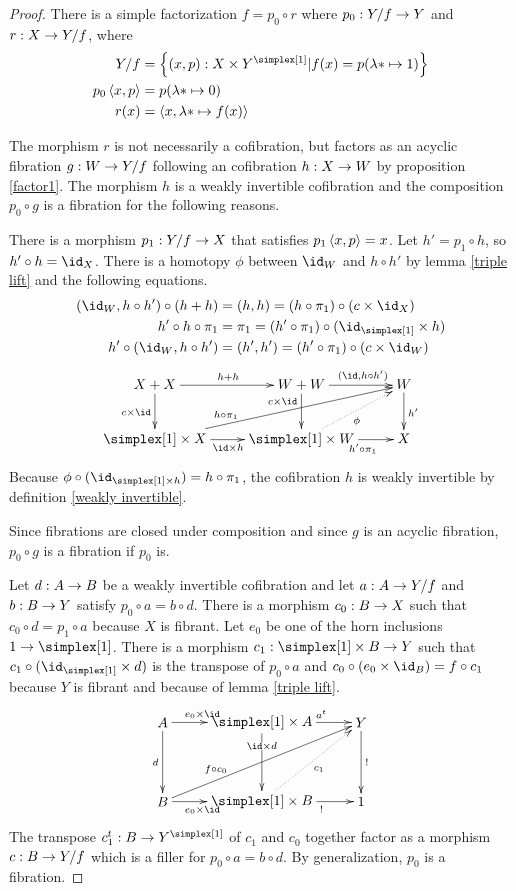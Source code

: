 \documentclass[csh.tex]{subfiles}
\begin{document}
\begin{proof} There is a simple factorization $f = p_0\circ r$ where $p_0: Y/f\to Y$ and $r: X\to Y/f$, where 
\begin{align*}
Y/f &= \set{(x,p)\of X\times Y^{\simplex[1]}| f(x) = p(\function{*}{1}) }\\
p_0\tuplet{x,p} &= p(\function{*}{0})\\
r(x) &= \tuplet{x,\function{*}{f(x)}}
\end{align*}

The morphism $r$ is not necessarily a cofibration, but factors as an acyclic fibration $g: W\to Y/f$ following an cofibration $h: X\to W$ by proposition \ref{factor1}. The morphism $h$ is a weakly invertible cofibration and the composition $p_0\circ g$ is a fibration for the following reasons.

There is a morphism $p_1: Y/f\to X$ that satisfies $p_1\left\langle x,p \right\rangle=x$. Let $h'=p_1\circ h$, so $h'\circ h = \id_X$.
There is a homotopy $\phi$ between $\id_{W}$ and $h\circ h'$ by lemma \ref{triple lift} and the following equations.
\begin{align*}
(\id_W,h\circ h')\circ(h+h)&=(h,h)= (h\circ\pi_1)\circ (c\times \id_X)\\
h'\circ h\circ \pi_1&=\pi_1=(h'\circ\pi_1)\circ(\id_{\simplex[1]}\times h)\\
h'\circ(\id_W,h\circ h')&=(h',h')= (h'\circ\pi_1)\circ (c\times \id_W)
\end{align*}
\[\xymatrix{
X+X\ar[d]_{c\times \id}\ar[r]^{h+h} & W+W\ar[d]_(.3){c\times \id}\ar[r]^(.6){(\id,h\circ h')} & W\ar[d]^{h'}\\
\simplex[1]\times X\ar[r]_{\id\times h} \ar[urr]^(.3){h\circ\pi_1}  & \simplex[1]\times W\ar[r]_(.6){h'\circ\pi_1} \ar@{.>}[ur]_\phi & X
}\]
Because $\phi\circ(\id_{\simplex[1]\times h}) = h\circ \pi_1$, the cofibration $h$ is weakly invertible by definition \ref{weakly invertible}. 

Since fibrations are closed under composition and since $g$ is an acyclic fibration, $p_0\circ g$ is a fibration if $p_0$ is. 

Let $d: A\to B$ be a weakly invertible cofibration and let $a: A\to Y/f$ and $b: B\to Y$ satisfy $p_0\circ a = b\circ d$. There is a morphism $c_0: B\to X$ such that $c_0\circ d = p_1\circ a$ because $X$ is fibrant. Let $e_0$ be one of the horn inclusions $1\to \simplex[1]$. There is a morphism $c_1\of\simplex[1]\times B\to Y$ such that $c_1\circ{(\id_{\simplex[1]}\times d)}$ is the transpose of $p_0\circ a$ and $c_0\circ (e_0\times \id_B) = f\circ c_1$ because $Y$ is fibrant and because of lemma \ref{triple lift}.
\[\xy
(0,20)*+{A}="AC",(25,20)*+{\simplex[1]\times A}="BC",(50,20)*+{Y}="Y",
(0,0)*+{B}="AD",(25,0)*+{\simplex[1]\times B}="BD",(50,0)*+{1}="one"
\ar^(.4){e_0\times\id} "AC";"BC"
\ar_{d} "AC";"AD"
\ar_(.4){e_0\times\id} "AD";"BD"
\ar^(.3){f\circ c_0} "AD";"Y"
\ar|(.3){\id\times d} "BC";"BD"
\ar^(.6){a^t} "BC";"Y"
\ar@{.>}_{c_1} "BD";"Y"
\ar_(.6){\bang} "BD";"one"
\ar^{\bang} "Y";"one"
\endxy\]
The transpose $c_1^t\of B\to Y^{\simplex[1]}$ of $c_1$ and $c_0$ together factor as a morphism $c: B \to Y/f$ which is a filler for $p_0\circ a = b\circ d$. By generalization, $p_0$ is a fibration.
\end{proof}
\end{document}
